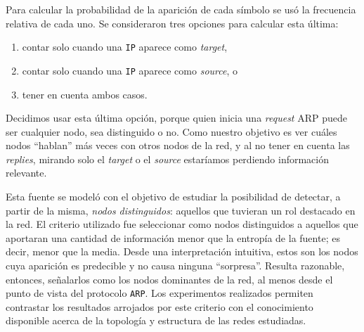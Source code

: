 \begin{enumerate}
    Para calcular la probabilidad de la aparición de cada símbolo se usó la
    frecuencia relativa de cada uno. Se consideraron tres opciones para
    calcular esta última:
    \begin{enumerate}
        \item contar solo cuando una \texttt{IP} aparece como \emph{target},
        \item contar solo cuando una \texttt{IP} aparece como \emph{source}, o
        \item tener en cuenta ambos casos.
    \end{enumerate}
    Decidimos usar esta última opción, porque quien inicia una \emph{request}
    ARP puede ser cualquier nodo, sea distinguido o no. Como nuestro objetivo
    es ver cuáles nodos ``hablan'' más veces con otros nodos de la red, y al
    no tener en cuenta las \emph{replies}, mirando solo el \emph{target} o el
    \emph{source} estaríamos perdiendo información relevante.

    Esta fuente se modeló con el objetivo de estudiar la posibilidad de
    detectar, a partir de la misma, \emph{nodos distinguidos}: aquellos que
    tuvieran un rol destacado en la red. El criterio utilizado fue seleccionar
    como nodos distinguidos a aquellos que aportaran una cantidad de
    información menor que la entropía de la fuente; es decir, menor que la
    media. Desde una interpretación intuitiva, estos son los nodos cuya
    aparición es predecible y no causa ninguna ``sorpresa''. Resulta
    razonable, entonces, señalarlos como los nodos dominantes de la red, al
    menos desde el punto de vista del protocolo \texttt{ARP}. Los experimentos
    realizados permiten contrastar los resultados arrojados por este criterio
    con el conocimiento disponible acerca de la topología y estructura de las
    redes estudiadas.

\end{enumerate}
